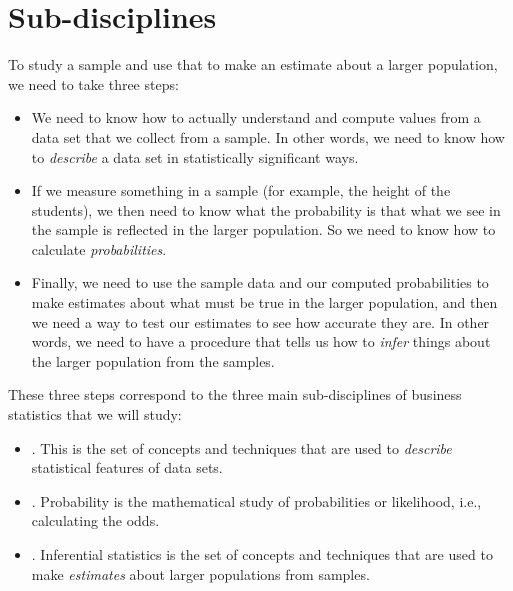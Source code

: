 \documentclass[../../main.tex]{subfiles}
\begin{document}
\section{Sub-disciplines}

To study a sample and use that to make an estimate about a larger population, we need to take three steps:

\begin{itemize}

  \item We need to know how to actually understand and compute values from a data set that we collect from a sample. In other words, we need to know how to \emph{describe} a data set in statistically significant ways.
  
  \item If we measure something in a sample (for example, the height of the students), we then need to know what the probability is that what we see in the sample is reflected in the larger population. So we need to know how to calculate \emph{probabilities}.
  
  \item Finally, we need to use the sample data and our computed probabilities to make estimates about what must be true in the larger population, and then we need a way to test our estimates to see how accurate they are. In other words, we need to have a procedure that tells us how to \emph{infer} things about the larger population from the samples.

\end{itemize}

These three steps correspond to the three main sub-disciplines of business statistics that we will study:

\begin{itemize}

  \item {}. This is the set of concepts and techniques that are used to \emph{describe} statistical features of data sets.
    
  \item {}. Probability is the mathematical study of probabilities or likelihood, i.e., calculating the odds.
  
  \item {}. Inferential statistics is the set of concepts and techniques that are used to make \emph{estimates} about larger populations from samples.

\end{itemize}
\end{document}

